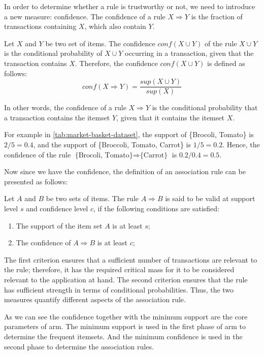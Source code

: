 In order to determine whether a rule is trustworthy or not, we need to introduce a new measure: confidence.
The confidence of a rule $X \Rightarrow Y$ is the fraction of transactions containing $X$, which also contain $Y$.
\begin{definition}
    Let $X$ and $Y$ be two set of items.
    The confidence $conf(X \cup Y)$ of the rule $X \cup Y$ is the conditional probability of $X \cup Y$ occurring in a transaction, given that the transaction contains $X$.
    Therefore, the confidence $conf(X \cup Y)$ is defined as follows:
    \begin{equation}
        conf(X \Rightarrow Y) = \frac{sup(X \cup Y)}{sup(X)}
    \end{equation}
\end{definition}
In other words, the confidence of a rule $X \Rightarrow Y$ is the conditional probability that a transaction contains the itemset $Y$, given that it contains the itemset $X$.

For example in \autoref{tab:market-basket-dataset}, the support of \{Brocoli, Tomato\} is $2/5=0.4$, and the support of \{Broccoli, Tomato, Carrot\} is $1/5=0.2$.
Hence, the confidence of the rule $\text{\{Brocoli, Tomato\}} \Rightarrow \text{\{Carrot\}}$ is $0.2 / 0.4 = 0.5$.

Now since we have the confidence, the definition of an association rule can be presented as follows:
\begin{definition}
    Let $A$ and $B$ be two sets of items.
    The rule $A \Rightarrow B$ is said to be valid at support level $s$ and confidence level $c$, if the following conditions are satisfied:
    \begin{enumerate}
        \item The support of the item set $A$ is at least $s$;
        \item The confidence of $A \Rightarrow B$ is at least $c$;
    \end{enumerate}
    The first criterion ensures that a sufficient number of transactions are relevant to the rule; therefore, it has the required critical mass for it to be considered relevant to the application at hand.
    The second criterion ensures that the rule has sufficient strength in terms of conditional probabilities.
    Thus, the two measures quantify different aspects of the association rule.
\end{definition}
As we can see the confidence together with the minimum support are the core parameters of \acl{arm}.
The minimum support is used in the first phase of \acl{arm} to determine the frequent itemsets.
And the minimum confidence is used in the second phase to determine the association rules.

